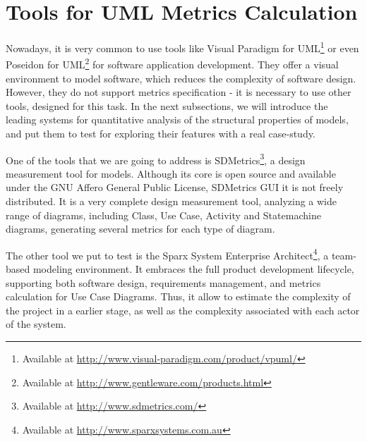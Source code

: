 \section{Tools for UML Metrics Calculation} \label{tools}

Nowadays, it is very common to use tools like \textsf{Visual Paradigm for UML\footnote{Available at \url{http://www.visual-paradigm.com/product/vpuml/}}} or even \textsf{Poseidon for UML}\footnote{Available at \url{http://www.gentleware.com/products.html}} for software application development.
They offer a visual environment to model software, which reduces the complexity of software design.
However, they do not support metrics specification - it is necessary to use other tools, designed for this task.
In the next subsections, we will introduce the leading systems for quantitative analysis of the structural properties of \umlS models, and put them to test for exploring their features with a real case-study.

One of the tools that we are going to address is SDMetrics\footnote{Available at \url{http://www.sdmetrics.com/}}, a design measurement tool for \umlS models.
Although its core is open source and available under the GNU Affero General Public License, SDMetrics GUI it is not freely distributed. 
It is a very complete design measurement tool, analyzing a wide range of \umlS diagrams, including Class, Use Case, Activity and Statemachine diagrams, generating several metrics for each type of diagram.

The other tool we put to test is the \textsf{Sparx System Enterprise Architect}{\footnote{Available at \url{http://www.sparxsystems.com.au}}}, a team-based modeling environment. 
It embraces the full product development lifecycle, supporting both software design, requirements management, and metrics calculation for Use Case Diagrams.
Thus, it allow to estimate the complexity of the project in a earlier stage, as well as the complexity associated with each actor of the system.
